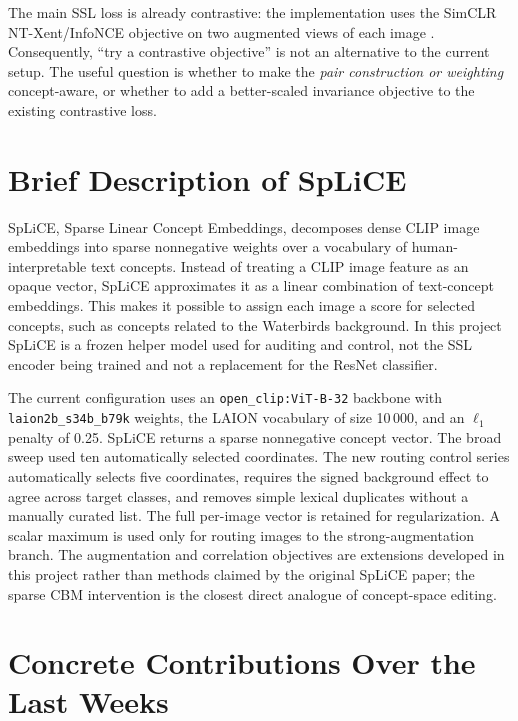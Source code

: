 \documentclass[11pt,a4paper]{article}
\begin{document}
The main SSL loss is already contrastive: the implementation uses the SimCLR
NT-Xent/InfoNCE objective on two augmented views of each image
\cite{chen2020simclr}. Consequently, ``try a contrastive objective'' is not an
alternative to the current setup. The useful question is whether to make the
\emph{pair construction or weighting} concept-aware, or whether to add a
better-scaled invariance objective to the existing contrastive loss.

\section{Brief Description of SpLiCE}

SpLiCE, Sparse Linear Concept Embeddings, decomposes dense CLIP image embeddings
into sparse nonnegative weights over a vocabulary of human-interpretable text
concepts. Instead of treating a CLIP image feature as an opaque vector, SpLiCE
approximates it as a linear combination of text-concept embeddings. This makes
it possible to assign each image a score for selected concepts, such as concepts
related to the Waterbirds background. In this project SpLiCE is a frozen helper
model used for auditing and control, not the SSL encoder being trained and not a
replacement for the ResNet classifier.

The current configuration uses an \texttt{open\_clip:ViT-B-32} backbone with
\texttt{laion2b\_s34b\_b79k} weights, the LAION vocabulary of size 10\,000, and
an $\ell_1$ penalty of 0.25. SpLiCE returns a sparse nonnegative concept vector.
The broad sweep used ten automatically selected coordinates. The new routing
control series automatically selects five coordinates, requires the signed
background effect to agree across target classes, and removes simple lexical
duplicates without a manually curated list. The full per-image vector is retained
for regularization. A scalar maximum is used only
for routing images to the strong-augmentation branch. The augmentation and
correlation objectives are extensions developed in this project rather than
methods claimed by the original SpLiCE paper; the sparse CBM intervention is
the closest direct analogue of concept-space editing.

\section{Concrete Contributions Over the Last Weeks}
\end{document}
